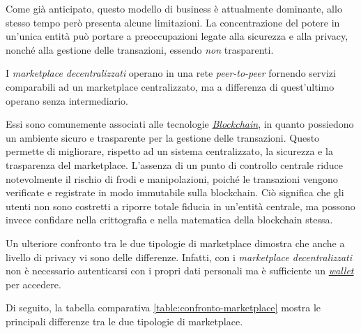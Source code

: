 Come già anticipato, questo modello di business è attualmente dominante, allo stesso tempo però presenta alcune limitazioni. La concentrazione del potere in un'unica entità può portare a preoccupazioni legate alla sicurezza e alla privacy, nonché alla gestione delle transazioni, essendo \textit{non} trasparenti. \cite{def-centralized-marketplace}

I \textit{marketplace decentralizzati} operano in una rete \textit{peer-to-peer} fornendo servizi comparabili ad un marketplace centralizzato, ma a differenza di quest'ultimo operano senza intermediario.

Essi sono comunemente associati alle tecnologie \hyperref[sec:blockchain]{\textit{Blockchain}}, in quanto possiedono un ambiente sicuro e trasparente per la gestione delle transazioni. Questo permette di migliorare, rispetto ad un sistema centralizzato, la sicurezza e la trasparenza del marketplace. L'assenza di un punto di controllo centrale riduce notevolmente il rischio di frodi e manipolazioni, poiché le transazioni vengono verificate e registrate in modo immutabile sulla blockchain. Ciò significa che gli utenti non sono costretti a riporre totale fiducia in un'entità centrale, ma possono invece confidare nella crittografia e nella matematica della blockchain stessa. \cite{def-decentralized-marketplace}

Un ulteriore confronto tra le due tipologie di marketplace dimostra che anche a livello di privacy vi sono delle differenze. Infatti, con i \textit{marketplace decentralizzati} non è necessario autenticarsi con i propri dati personali ma è sufficiente un \hyperref[sec:wallet]{\textit{wallet}} per accedere. \cite{def-decentralized-marketplace}

Di seguito, la tabella comparativa \ref{table:confronto-marketplace} mostra le principali differenze tra le due tipologie di marketplace.

\newpage

